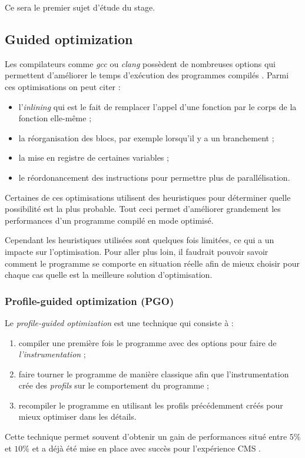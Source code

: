 \documentclass[a4paper,11pt]{report}
\begin{document}
\bigskip
Ce sera le premier sujet d'étude du stage.

\subsection{Guided optimization}\label{section:pgo}
Les compilateurs comme \emph{gcc} ou \emph{clang} possèdent de nombreuses options qui permettent d'améliorer le temps d'exécution des programmes compilés \cite{gcc}.
Parmi ces optimisations on peut citer :
\begin{itemize}
    \item l'\emph{inlining} qui est le fait de remplacer l'appel d'une fonction par le corps de la fonction elle-même ;
    \item la réorganisation des blocs, par exemple lorsqu'il y a un branchement ;
    \item la mise en registre de certaines variables ;
    \item le réordonancement des instructions pour permettre plus de parallélisation.
\end{itemize}
Certaines de ces optimisations utilisent des heuristiques pour déterminer quelle possibilité est la plus probable.
Tout ceci permet d'améliorer grandement les performances d'un programme compilé en mode optimisé.

Cependant les heuristiques utilisées sont quelques fois limitées, ce qui a un impacte sur l'optimisation.
Pour aller plus loin, il faudrait pouvoir savoir comment le programme se comporte en situation réelle afin de mieux choisir pour chaque cas quelle est la meilleure solution d'optimisation.

\subsubsection{Profile-guided optimization (PGO)}
Le \emph{profile-guided optimization} est une technique qui consiste à :
\begin{enumerate}
    \item compiler une première fois le programme avec des options pour faire de \emph{l'instrumentation} ;
    \item faire tourner le programme de manière classique afin que l'instrumentation crée des \emph{profils} sur le comportement du programme ;
    \item recompiler le programme en utilisant les profils précédemment créés pour mieux optimiser dans les détails.
\end{enumerate}
Cette technique permet souvent d'obtenir un gain de performances situé entre $5\%$ et $10\%$ et a déjà été mise en place avec succès pour l'expérience CMS \cite{VIPGOforCMSReco}.
\end{document}
